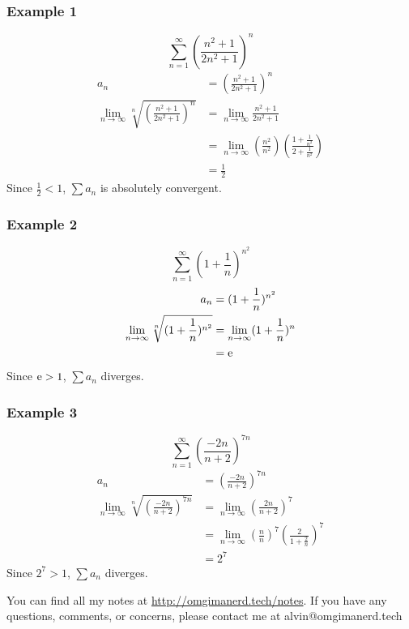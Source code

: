 \documentclass[letterpaper, 12pt]{math}
\begin{document}
\subsubsection*{Example 1}
\[ \sum_{n=1}^{\infty}(\frac{n^{2}+1}{2n^{2}+1})^{n} \]
\begin{align*}
  a_{n} &= (\frac{n^{2}+1}{2n^{2}+1})^{n} \\
  \lim_{n\to\infty}\sqrt[n]{(\frac{n^{2}+1}{2n^{2}+1})^{n}} &=
    \lim_{n\to\infty}\frac{n^{2}+1}{2n^{2}+1} \\
  &= \lim_{n\to\infty}
    (\frac{n^{2}}{n^{2}})(\frac{1+\frac{1}{n^{2}}}{2+\frac{1}{n^{2}}}) \\
  &= \frac{1}{2}
\end{align*}
Since \( \frac{1}{2} < 1 \), \( \sum{a_{n}} \) is absolutely convergent.

\subsubsection*{Example 2}
\[ \sum_{n=1}^{\infty}(1+\frac{1}{n})^{n^{2}} \]
\begin{align*}
  a_{n} &= (1+\frac{1}{n})^{n^{2}} \\
  \lim_{n\to\infty}\sqrt[n]{(1+\frac{1}{n})^{n^{2}}} &=
    \lim_{n\to\infty}(1+\frac{1}{n})^{n} \\
  &= \mathrm{e}
\end{align*}
Since \( \mathrm{e} > 1 \), \( \sum{a_{n}} \) diverges.

\subsubsection*{Example 3}
\[ \sum_{n=1}^{\infty}(\frac{-2n}{n+2})^{7n} \]
\begin{align*}
  a_{n} &= (\frac{-2n}{n+2})^{7n} \\
  \lim_{n\to\infty}\sqrt[n]{(\frac{-2n}{n+2})^{7n}} &=
    \lim_{n\to\infty}(\frac{2n}{n+2})^{7} \\
  &= \lim_{n\to\infty}(\frac{n}{n})^{7}(\frac{2}{1+\frac{2}{n}})^{7} \\
  &= 2^{7}
\end{align*}
Since \( 2^{7} > 1 \), \( \sum{a_{n}} \) diverges.

\begin{center}
  You can find all my notes at \url{http://omgimanerd.tech/notes}. If you have
  any questions, comments, or concerns, please contact me at
  alvin@omgimanerd.tech
\end{center}
\end{document}
